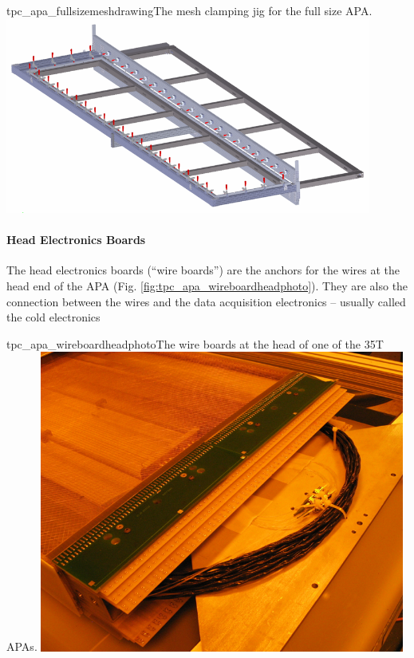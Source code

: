 \begin{cdrfigure}{tpc_apa_fullsizemeshdrawing}{The mesh clamping jig for the full size APA.}
\includegraphics[width=0.9\textwidth]{figures/tpc_apa_fullsizemeshdrawing.png} 
\end{cdrfigure}

\paragraph{Head Electronics Boards}

The head electronics boards (``wire boards'') are the anchors for the wires at the head end of the APA (Fig. \ref{fig:tpc_apa_wireboardheadphoto}).  They are also the connection between the wires and the data acquisition electronics -- usually called the cold electronics

\begin{cdrfigure}{tpc_apa_wireboardheadphoto}{The wire boards at the head of one of the 35T APAs.}
\includegraphics[width=0.9\textwidth]{figures/tpc_apa_wireboardheadphoto.png} 
\end{cdrfigure}

